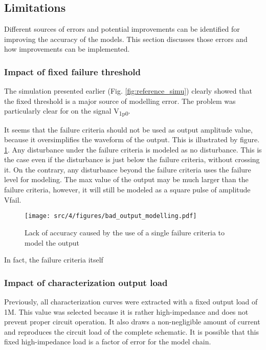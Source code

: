 \subsection{Limitations}
\label{sec:current-limitations}

Different sources of errors and potential improvements can be identified for improving the accuracy of the models.
This section discusses those errors and how improvements can be implemented.

\subsubsection{Impact of fixed failure threshold}
\label{sec:fixed-failure-threshold}

The simulation presented earlier (Fig. \ref{fig:reference_simu}) clearly showed that the fixed threshold is a major source of modelling error.
The problem was particularly clear for on the signal V\textsubscript{1p0}.

It seems that the failure criteria should not be used as output amplitude value, because it oversimplifies the waveform of the output.
This is illustrated by figure. \ref{fig:impact-single-failure-criteria}.
Any disturbance under the failure criteria is modeled as no disturbance.
This is the case even if the disturbance is just below the failure criteria, without crossing it.
On the contrary, any disturbance beyond the failure criteria uses the failure level for modeling.
The max value of the output may be much larger than the failure criteria, however, it will still be modeled as a square pulse of amplitude Vfail.

\begin{figure}[!h]
  \centering
  \texttt{[image: src/4/figures/bad\_output\_modelling.pdf]}
  \caption{Lack of accuracy caused by the use of a single failure criteria to model the output}
  \label{fig:impact-single-failure-criteria}
\end{figure}

In fact, the failure criteria itself

\subsubsection{Impact of characterization output load}

Previously, all characterization curves were extracted with a fixed output load of 1M\textOmega{}.
This value was selected because it is rather high-impedance and does not prevent proper circuit operation.
It also draws a non-negligible amount of current and reproduces the circuit load of the complete schematic.
It is possible that this fixed high-impedance load is a factor of error for the model chain.

